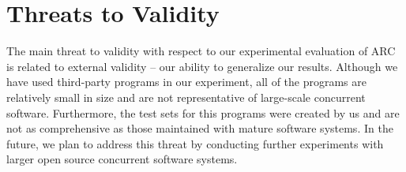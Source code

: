 \section{Threats to Validity}
\label{sec:threats}

The main threat to validity with respect to our experimental evaluation of ARC is related to external validity -- our ability to generalize our results. Although we have used third-party programs in our experiment, all of the programs are relatively small in size and are not representative of large-scale concurrent software. Furthermore, the test sets for this programs were created by us and are not as comprehensive as those maintained with mature software systems. In the future, we plan to address this threat by conducting further experiments with larger open source concurrent software systems.